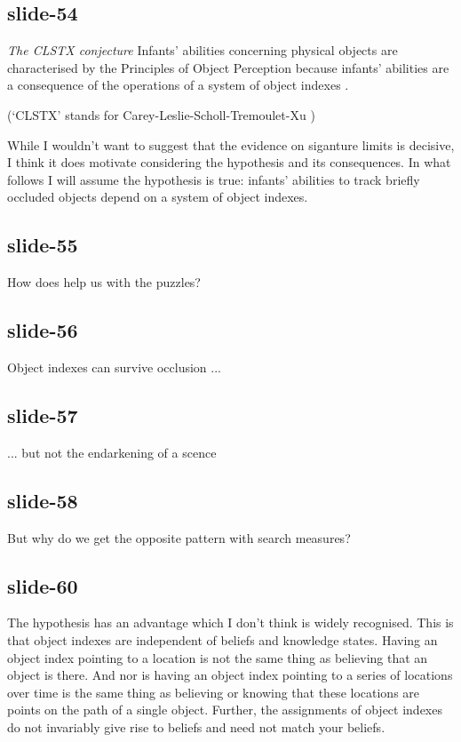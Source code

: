 \documentclass[12pt,\papersize]{extarticle}
\begin{document}
\subsection{slide-54}
\emph{The CLSTX conjecture}
Infants’ abilities concerning physical objects are
characterised by the Principles of Object Perception because infants’ abilities
are a consequence of the operations of a system of object indexes
\citep{Leslie:1998zk,Scholl:1999mi,Carey:2001ue,scholl:2007_objecta}.

(‘CLSTX’ stands for Carey-Leslie-Scholl-Tremoulet-Xu \citep[see][]{Leslie:1998zk,Scholl:1999mi,Carey:2001ue,scholl:2007_objecta})

While I wouldn’t want to suggest that the evidence on siganture limits is decisive, I think it
does motivate considering the hypothesis and its consequences. In what follows I will assume the
hypothesis is true: infants’ abilities to track briefly occluded objects depend on a system of
object indexes.

\subsection{slide-55}
How does help us with the puzzles?

\subsection{slide-56}
Object indexes can survive occlusion ...

\subsection{slide-57}
... but not the endarkening of a scence

\subsection{slide-58}
But why do we get the opposite pattern with search measures?

\subsection{slide-60}
The hypothesis has an advantage which I don’t think is widely
recognised.
This is that object indexes are independent of beliefs and knowledge
states.
Having an object index pointing to a location is not the same thing
as believing that an object is there.
And nor is having an object index pointing to a series of locations over time
is the same thing as believing or knowing that these locations
are points on the path of a single object.
Further, the assignments of object indexes do not invariably give rise
to beliefs and need not match your beliefs.
\end{document}
